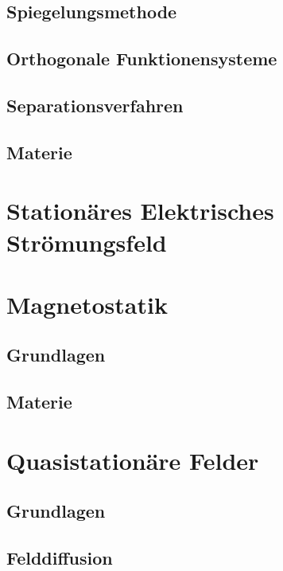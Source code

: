 \subsection{Spiegelungsmethode}

\subsection{Orthogonale Funktionensysteme}

\subsection{Separationsverfahren}

\subsection{Materie}

\section{Stationäres Elektrisches Strömungsfeld}

\section{Magnetostatik}
\subsection{Grundlagen}

\subsection{Materie}

\section{Quasistationäre Felder}
\subsection{Grundlagen}

\subsection{Felddiffusion}

